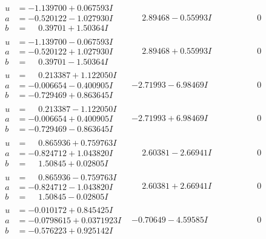 \documentclass[1p]{elsarticle_modified}
\theoremstyle{definition}
\begin{document}
$$\begin{array}{c|c|c}
\begin{aligned}
u &= -1.139700 + 0.067593 I \\
a &= -0.520122 - 1.027930 I \\
b &= \phantom{-}0.39701 + 1.50364 I\end{aligned}
 & \phantom{-}2.89468 - 0.55993 I & \phantom{-0.000000 } 0 \\ \hline\begin{aligned}
u &= -1.139700 - 0.067593 I \\
a &= -0.520122 + 1.027930 I \\
b &= \phantom{-}0.39701 - 1.50364 I\end{aligned}
 & \phantom{-}2.89468 + 0.55993 I & \phantom{-0.000000 } 0 \\ \hline\begin{aligned}
u &= \phantom{-}0.213387 + 1.122050 I \\
a &= -0.006654 - 0.400905 I \\
b &= -0.729469 + 0.863645 I\end{aligned}
 & -2.71993 - 6.98469 I & \phantom{-0.000000 } 0 \\ \hline\begin{aligned}
u &= \phantom{-}0.213387 - 1.122050 I \\
a &= -0.006654 + 0.400905 I \\
b &= -0.729469 - 0.863645 I\end{aligned}
 & -2.71993 + 6.98469 I & \phantom{-0.000000 } 0 \\ \hline\begin{aligned}
u &= \phantom{-}0.865936 + 0.759763 I \\
a &= -0.824712 + 1.043820 I \\
b &= \phantom{-}1.50845 + 0.02805 I\end{aligned}
 & \phantom{-}2.60381 - 2.66941 I & \phantom{-0.000000 } 0 \\ \hline\begin{aligned}
u &= \phantom{-}0.865936 - 0.759763 I \\
a &= -0.824712 - 1.043820 I \\
b &= \phantom{-}1.50845 - 0.02805 I\end{aligned}
 & \phantom{-}2.60381 + 2.66941 I & \phantom{-0.000000 } 0 \\ \hline\begin{aligned}
u &= -0.010172 + 0.845425 I \\
a &= -0.0798615 + 0.0371923 I \\
b &= -0.576223 + 0.925142 I\end{aligned}
 & -0.70649 - 4.59585 I & \phantom{-0.000000 } 0\\

\end{array}$$
\end{document}
